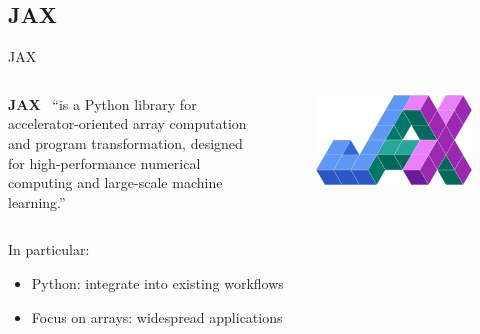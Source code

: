 \documentclass[usenames,dvipsnames,t]{beamer}
\newcommand{\ghlink}[1]{\href{https://github.com/#1}{\textcolor{black}{\faGithub}}}
\begin{document}
\subsection{\textsc{JAX}}


\begin{frame}{\textsc{JAX}}

  \def\x{5mm}
  \def\y{1mm}

  \begin{columns}
    \begin{column}{0.84\linewidth}
      \textbf{\textsc{JAX}}~\ghlink{jax-ml/jax}
      ``is a Python library for accelerator-oriented array computation and program transformation, designed for high-performance numerical computing and large-scale machine learning.''~\cite{jax2018github}
    \end{column}
    \begin{column}{0.15\linewidth}
      \begin{figure}
        \centering
        \includegraphics[width=0.95\linewidth]{Figures/jax.png}
      \end{figure}
    \end{column}
  \end{columns}

  \vspace{\x}

  In particular:
  \begin{itemize}
    \vspace{\y}
    \item Python: integrate into existing workflows

    \vspace{\y}

    \item Focus on arrays: widespread applications
    
    \vspace{\y}


\end{itemize}
\end{frame}
\end{document}
